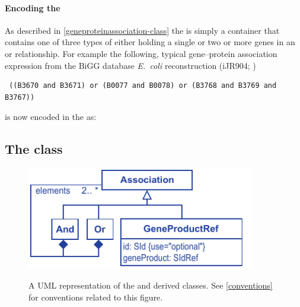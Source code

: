 \paragraph{Encoding the \GeneProteinAssociation}
As described in \ref{geneproteinassociation-class} the \GeneProteinAssociation is simply a container that contains one of three types of \Association either holding a single \GeneProductRef or two or more genes in an \GeneAnd or \GeneOr relationship. For example the following, typical gene--protein association expression from the BiGG database \emph{E.~coli} reconstruction (iJR904; \citealt{ijr904, bigg})
%
\begin{verbatim}
 ((B3670 and B3671) or (B0077 and B0078) or (B3768 and B3769 and B3767))
\end{verbatim}
%
is now encoded in the \FBCPackage as:
%
\subsection{The \FBC {} class}
\label{association-class}

%
\begin{figure}[h!]
  \centering
  \includegraphics[width=10cm]{images/v2harmony_fbc_association.pdf}\\
  \caption{A UML representation of the \FBCPackage \Association and derived
	classes. See \ref{conventions} for conventions related to this figure.}
  \label{fig:fbc_uml_ass}
\end{figure}

